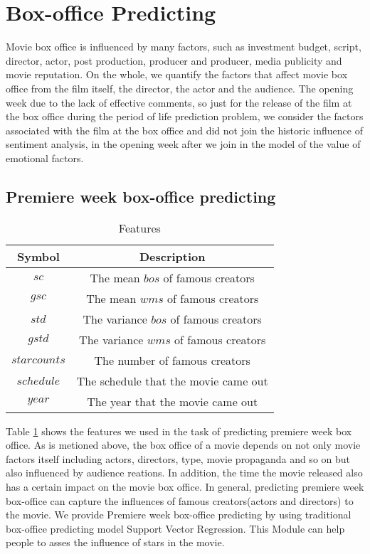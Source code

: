 \section{Box-office Predicting}
Movie box office is influenced by many factors, such as investment budget, script, director, actor, post production, producer and producer, media publicity and movie reputation. On the whole, we quantify the factors that affect movie box office from the film itself, the director, the actor and the audience. The opening week due to the lack of effective comments, so just for the release of the film at the box office during the period of life prediction problem, we consider the factors associated with the film at the box office and did not join the historic influence of sentiment analysis, in the opening week after we join in the model of the value of emotional factors.

\label{sec:predict}
\subsection{Premiere week box-office predicting}
\begin{table}[!htb]
  \centering
\begin{tabular}{|c|c|}
\hline
Symbol&Description\\
\hline
$sc$ &The mean $bos$ of famous creators\\
\hline
$gsc$&The mean $wms$ of famous creators\\
\hline
$std$&The variance $bos$ of famous creators\\
\hline
$gstd$&The variance $wms$ of famous creators\\
\hline
$starcounts$& The number of famous creators\\
\hline
$schedule$ & The schedule that the movie came out\\
\hline
$year$ & The year that the movie came out\\
\hline
\end{tabular}
  \caption{Features}
\label{tab:feature}
\end{table}
\par Table \ref{tab:feature} shows the features we used in the task of predicting premiere week box office. As is metioned above, the box office of a movie depends on not only movie factors itself including actors, directors, type, movie propaganda and so on but also influenced by audience reations. In addition, the time the movie released also has a certain impact on the movie box office. In general, predicting premiere week box-office can capture the influences of famous creators(actors and directors) to the movie. We provide Premiere week box-office predicting by using traditional box-office predicting model Support Vector Regression. This Module can help people to asses the influence of stars in the movie.

